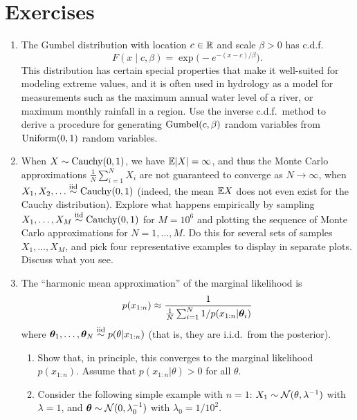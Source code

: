 \documentclass[12pt]{article}
\begin{document}


\section{Exercises}

\begin{enumerate}
\item The Gumbel distribution with location $c\in\mathbb{R}$ and scale $\beta>0$ has c.d.f.\
$$ F(x\mid c,\beta) = \exp\big(-e^{-(x-c)/\beta}\big) .$$
This distribution has certain special properties that make it well-suited for modeling extreme values, and it is often used in hydrology as a model for measurements such as the maximum annual water level of a river, or maximum monthly rainfall in a region. Use the inverse c.d.f.\ method to derive a procedure for generating $\operatorname*{Gumbel}(c,\beta)$ random variables from $\operatorname*{Uniform}(0,1)$ random variables.
\item When $X\sim\operatorname*{Cauchy}(0,1)$, we have $\mathbb{E}|X|=\infty$, and thus the Monte Carlo approximations $\frac{1}{N}\sum_{i = 1}^N X_i$ are not guaranteed to converge as $N\to\infty$, when $X_1,X_2,\dotsc\stackrel{\mathrm{iid}}{\sim} \operatorname*{Cauchy}(0,1)$ (indeed, the mean $\mathbb{E} X$ does not even exist for the Cauchy distribution).  Explore what happens empirically by sampling $X_1,\dotsc,X_M\stackrel{\mathrm{iid}}{\sim} \operatorname*{Cauchy}(0,1)$ for $M=10^6$ and plotting the sequence of Monte Carlo approximations for $N = 1,\dotsc,M$. Do this for several sets of samples $X_1,\dotsc,X_M$, and pick four representative examples to display in separate plots. Discuss what you see.
\item The ``harmonic mean approximation'' of the marginal likelihood is
$$ p(x_{1:n}) \approx \frac{1}{\frac{1}{N}\sum_{i = 1}^N 1/p(x_{1:n}|{\bm\theta}_i)}$$
where ${\bm\theta}_1,\dotsc,{\bm\theta}_N\stackrel{\mathrm{iid}}{\sim} p(\theta|x_{1:n})$ (that is, they are i.i.d.\ from the posterior).
\begin{enumerate}
\item Show that, in principle, this converges to the marginal likelihood $p(x_{1:n})$. Assume that $p(x_{1:n}|\theta)>0$ for all $\theta$.
\item Consider the following simple example with $n=1$: $X_1\sim \mathcal{N}(\theta,\lambda^{-1})$ with $\lambda=1$, and
    ${\bm\theta}\sim\mathcal{N}(0,\lambda_0^{-1})$ with $\lambda_0=1/10^2$.

\end{enumerate}
\end{enumerate}
\end{document}

